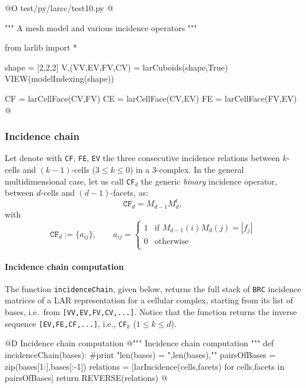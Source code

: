 \documentclass[11pt,oneside]{article}	%
\begin{document}
@O test/py/larcc/test10.py
@{""" A mesh model and various incidence operators """

from larlib import *

shape = [2,2,2]
V,(VV,EV,FV,CV) = larCuboids(shape,True)
VIEW(modelIndexing(shape))

CF = larCellFace(CV,FV)
CE = larCellFace(CV,EV)
FE = larCellFace(FV,EV)
@}

\subsubsection{Incidence chain}

Let denote with \texttt{CF}, \texttt{FE}, \texttt{EV} the three consecutive incidence relations between $k$-cells and $(k-1)$-cells ($3\leq k\leq 0$) in a 3-complex. In the general multidimensional case, let us call \texttt{CF}$_d$  the generic \emph{binary} incidence operator, between $d$-cells and $(d-1)$-facets, as:
\[
\texttt{CF}_d = M_{d-1} M_d^t, 
\]
with
\[
\texttt{CF}_d := \{a_{ij}\}, \qquad a_{ij} = 
\left\{
\begin{array}{cl}
1 & \mbox{if\ } M_{d-1}(i) M_d(j) = |f_j|  \\
0 & \mbox{otherwise}  \\  
\end{array}
\right.
\]

\paragraph{Incidence chain computation}
The function \texttt{incidenceChain}, given below, returns the full stack of \texttt{BRC} incidence matrices of a LAR representation for a cellular complex, starting from its list of bases, i.e.~from \texttt{[VV,EV,FV,CV,...]}. Notice that the function returns the inverse sequence 
\texttt{[EV,FE,CF,...]}, i.e., \texttt{CF}$_k$ ($1\leq k\leq d$).

@D Incidence chain computation
@{""" Incidence chain computation """
def incidenceChain(bases):
	#print "\n len(bases) = ",len(bases),"\n"
	pairsOfBases = zip(bases[1:],bases[:-1])
	relations = [larIncidence(cells,facets) 
					for cells,facets in pairsOfBases]
	return REVERSE(relations)
@}
\end{document}
